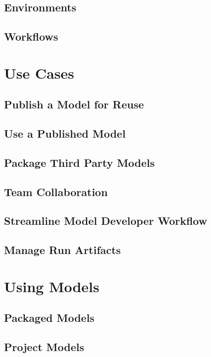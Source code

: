 \documentclass{article}
\begin{document}
\subsection{Environments}

\subsection{Workflows}

\section{Use Cases}

\subsection{Publish a Model for Reuse}

\subsection{Use a Published Model}

\subsection{Package Third Party Models}

\subsection{Team Collaboration}

\subsection{Streamline Model Developer Workflow}

\subsection{Manage Run Artifacts}

\section{Using Models}

\subsection{Packaged Models}

\subsection{Project Models}
\end{document}
